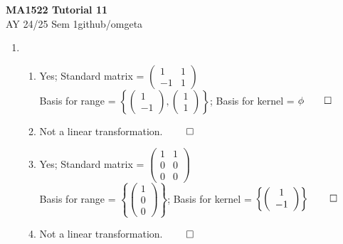 \documentclass[12pt, a4paper]{article}
\newcommand{\mytitle}{MA1522 Tutorial 11}
\newcommand{\myauthor}{github/omgeta}
\newcommand{\mydate}{AY 24/25 Sem 1}
\begin{document}
\raggedright
\footnotesize
\begin{center}
{\normalsize{\textbf{\mytitle}}} \\
{\footnotesize{\mydate\hspace{2pt}\textemdash\hspace{2pt}\myauthor}}
\end{center}

\begin{enumerate}[Q\arabic*.]
  \item 
    \begin{enumerate}[(\alph*)]
      \item Yes; Standard matrix = $\left(\begin{array}{cc} 1 & 1\\ -1 & 1 \end{array}\right)$\\ Basis for range = $\left\{ \left(\begin{array}{c} 1 \\ -1 \end{array}\right),  \left(\begin{array}{c} 1 \\ 1 \end{array}\right)\right\}$; Basis for kernel = $\phi \qed$

      \item Not a linear transformation. $\qed$

      \item Yes; Standard matrix = $\left(\begin{array}{cc} 1 & 1\\ 0 & 0\\ 0 & 0 \end{array}\right)$\\ Basis for range = $\left\{ \left(\begin{array}{c} 1 \\ 0\\0 \end{array}\right)\right\}$; Basis for kernel = $\left\{ \left(\begin{array}{c} 1\\-1 \end{array}\right)\right\} \qed$

      \item Not a linear transformation. $\qed$


\end{enumerate}
\end{enumerate}
\end{document}
